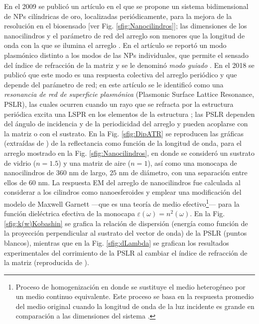 En el 2009 se public\'o un art\'iculo \cite{kabashin2009plasmonic} en el que se propone un sistema bidimensional de NPs cilíndricas de oro, localizadas periódicamente, para la mejora de la resoluci\'on  en el biosensado [ver Fig. \ref{sfig:Nanocilindros}]; las dimensiones de los nanocilindros y el parámetro de red del arreglo son menores que la longitud de onda con la que se ilumina el arreglo \cite{kabashin2009plasmonic}.  En el artículo se reportó un modo plasmónico distinto a los modos de las NPs individuales, que permite el sensado del índice de refracción de la matriz y se le denominó \textit{modo guiado} \cite{kabashin2009plasmonic}.  En el 2018 se publicó que este modo es una respuesta colectiva del arreglo periódico \cite{danilov2018ultra} y que depende del parámetro de red; en este artículo se le identificó como una \emph{resonancia de red de superficie plasmónica} (Plasmonic Surface Lattice Resonance, PSLR), las cuales ocurren cuando un rayo que se refracta por la estructura periódica excita una LSPR en los elementos de la estructura \cite{vakevainen2013plasmonic}; las PSLR dependen del  ángulo de incidencia y de la periodicidad del arreglo \cite{danilov2018ultra} y pueden acoplarse con la matriz o con el sustrato. En la Fig. \ref{sfig:DipATR} se reproducen las gráficas (extraídas de \cite{kabashin2009plasmonic}) de la reflectancia como función de la longitud de onda, para el arreglo mostrado en la Fig.  \ref{sfig:Nanocilindros}, en donde se consideró un sustrato de vidrio ($n=1.5$) y una matriz de aire ($n=1$), así como una monocapa de nanocilindros de $360$ nm de largo, $25$ nm de diámetro, con una separación entre ellos de $60$ nm. La respuesta EM del arreglo de nanocilindros   fue calculada al considerar a los cilindros como nanoesferoides y emplear una modificación del modelo de Maxwell Garnett \cite{atkinson2006anisotropic} ---que es una teoría de medio efectivo\footnote{Proceso de homogenización en donde se sustituye el medio heterogéneo por un medio continuo equivalente.  Este proceso se basa en la respuesta promedio del medio original cuando la longitud de onda de la luz incidente es grande en comparación a las dimensiones del sistema \cite{sihvola1999mixing}.}--- para la función dieléctrica efectiva de la monocapa $\varepsilon(\omega) = n^2 (\omega)$. En la Fig. \ref{sfig:k(w)Kobashin} se grafica la relación de dispersión  (energía como función de la  proyección perpendicular al sustrato del vector de onda) de la PSLR (puntos blancos), mientras que en la Fig.  \ref{sfig:dLambda} se grafican los resultados experimentales del corrimiento de la PSLR al cambiar el índice de refracción de la matriz (reproducida de \cite{danilov2018ultra}).

